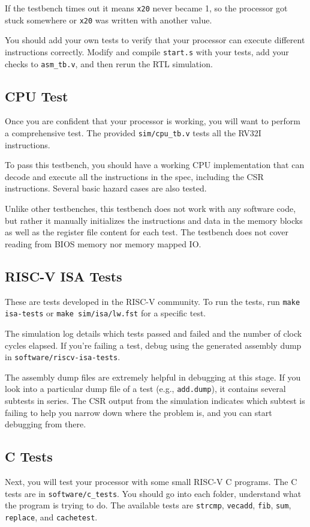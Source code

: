 If the testbench times out it means \verb|x20| never became 1,
so the processor got stuck somewhere or \verb|x20| was written with another value.

You should add your own tests to verify that your processor can execute
different instructions correctly.
Modify and compile \verb|start.s| with your tests, add your checks to \verb|asm_tb.v|,
and then rerun the RTL simulation.

\subsection{CPU Test}
Once you are confident that your processor is working,
you will want to perform a comprehensive test.
The provided \verb|sim/cpu_tb.v| tests all the RV32I instructions.

To pass this testbench, you should have a working CPU implementation that can decode and execute
all the instructions in the spec, including the CSR instructions.
Several basic hazard cases are also tested.

Unlike other testbenches, this testbench does not work with any software code,
but rather it manually initializes the instructions and data in the memory blocks
as well as the register file content for each test.
The testbench does not cover reading from BIOS memory nor memory mapped IO.

\subsection{RISC-V ISA Tests}
These are tests developed in the RISC-V community.
To run the tests, run \verb|make isa-tests| or \verb|make sim/isa/lw.fst| for a specific test.

The simulation log details which tests passed and failed and the number of clock cycles elapsed.
If you're failing a test, debug using the generated assembly dump in
\verb|software/riscv-isa-tests|.

The assembly dump files are extremely helpful in debugging at this stage.
If you look into a particular dump file of a test (e.g., \verb|add.dump|),
it contains several subtests in series.
The CSR output from the simulation indicates which subtest is failing
to help you narrow down where the problem is, and you can start debugging from there.

\subsection{C Tests}
Next, you will test your processor with some small RISC-V C programs.
The C tests are in \verb|software/c_tests|.
You should go into each folder, understand what the program is trying to do.
The available tests are \verb|strcmp|, \verb|vecadd|, \verb|fib|, \verb|sum|,
\verb|replace|, and \verb|cachetest|.

